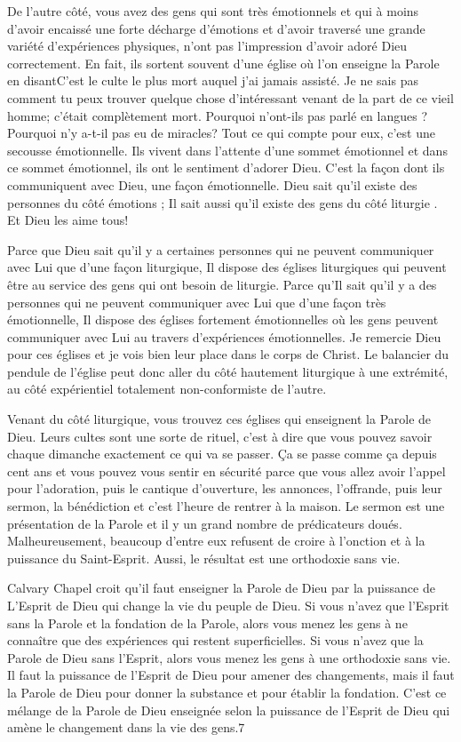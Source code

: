 De l’autre côté, vous avez des gens qui sont très émotionnels et qui à moins d’avoir encaissé une forte décharge
d'émotions et d'avoir traversé une grande variété d'expériences physiques, n’ont pas l’impression d’avoir adoré Dieu
correctement. En fait, ils sortent souvent d’une église où l’on enseigne la Parole en disant\frcolon\og C’est le culte le plus mort
auquel j’ai jamais assisté. Je ne sais pas comment tu peux trouver quelque chose d’intéressant venant de la part de
ce vieil homme; c’était complètement mort. Pourquoi n’ont-ils pas parlé en langues ? Pourquoi n'y a-t-il pas eu de
miracles?\fg{} Tout ce qui compte pour eux, c'est une secousse émotionnelle. Ils vivent dans l’attente d’une sommet
émotionnel et dans ce sommet émotionnel, ils ont le sentiment d’adorer Dieu. C’est la façon dont ils communiquent
avec Dieu, une façon émotionnelle. Dieu sait qu’il existe des personnes du côté \og émotions \fg{}; Il sait aussi qu’il existe
des gens du côté \og liturgie \fg{}. Et Dieu les aime tous!

Parce que Dieu sait qu’il y a certaines personnes qui ne peuvent communiquer avec Lui que d’une façon liturgique, Il
dispose des églises liturgiques qui peuvent être au service des gens qui ont besoin de liturgie. Parce qu'Il sait qu’il y a
des personnes qui ne peuvent communiquer avec Lui que d’une façon très émotionnelle, Il dispose des églises
fortement émotionnelles où les gens peuvent communiquer avec Lui au travers d’expériences émotionnelles. Je
remercie Dieu pour ces églises et je vois bien leur place dans le corps de Christ. Le balancier du pendule de l’église
peut donc aller du côté hautement liturgique à une extrémité, au côté \og expérientiel \fg{} totalement non-conformiste de
l’autre.

Venant du côté liturgique, vous trouvez ces églises qui enseignent la Parole de Dieu. Leurs cultes sont une sorte de
rituel, c’est à dire que vous pouvez savoir chaque dimanche exactement ce qui va se passer. Ça se passe comme ça
depuis cent ans et vous pouvez vous sentir en sécurité parce que vous allez avoir l’appel pour l’adoration, puis le
cantique d’ouverture, les annonces, l’offrande, puis leur sermon, la bénédiction et c’est l’heure de rentrer à la maison.
Le sermon est une présentation de la Parole et il y un grand nombre de prédicateurs doués. Malheureusement,
beaucoup d’entre eux refusent de croire à l’onction et à la puissance du Saint-Esprit. Aussi, le résultat est une
orthodoxie sans vie.

Calvary Chapel croit qu'il faut enseigner la Parole de Dieu par la puissance de L’Esprit de Dieu qui change la vie du
peuple de Dieu. Si vous n’avez que l’Esprit sans la Parole et la fondation de la Parole, alors vous menez les gens à ne
connaître que des expériences qui restent superficielles. Si vous n’avez que la Parole de Dieu sans l’Esprit, alors vous
menez les gens à une orthodoxie sans vie. Il faut la puissance de l’Esprit de Dieu pour amener des changements,
mais il faut la Parole de Dieu pour donner la substance et pour établir la fondation. C’est ce mélange de la Parole de
Dieu enseignée selon la puissance de l’Esprit de Dieu qui amène le changement dans la vie des gens.7

